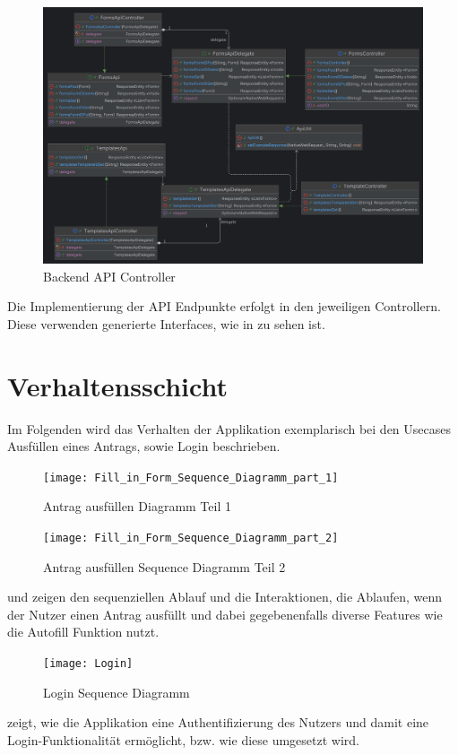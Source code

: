 \begin{figure}[H]
    \centering
    \includegraphics[width=15cm]{images/classDiagrams/Api}
    \caption{Backend API Controller}\label{fig:Backend-API-Controller}
\end{figure}

Die Implementierung der \ac{API} Endpunkte erfolgt in den jeweiligen Controllern.
Diese verwenden generierte Interfaces, wie in  zu sehen ist.


\section{Verhaltensschicht}\label{sec:verhaltensschicht}
Im Folgenden wird das Verhalten der Applikation exemplarisch bei den Usecases Ausfüllen 
eines Antrags, sowie Login beschrieben.

\begin{figure}[H]
    \texttt{[image: Fill\_in\_Form\_Sequence\_Diagramm\_part\_1]}
    \caption{Antrag ausfüllen Diagramm Teil 1}\label{fig:Antrag Flow 1}
\end{figure}   
\begin{figure}[H]
    \texttt{[image: Fill\_in\_Form\_Sequence\_Diagramm\_part\_2]}
    \caption{Antrag ausfüllen Sequence Diagramm Teil 2}\label{fig:Antrag Flow 2}
\end{figure}
 und  zeigen den sequenziellen Ablauf 
und die Interaktionen, die Ablaufen, wenn der Nutzer einen Antrag ausfüllt und dabei 
gegebenenfalls diverse Features wie die Autofill Funktion nutzt.
\begin{figure}[H]
    \texttt{[image: Login]}
    \caption{Login Sequence Diagramm}\label{fig:Login Flow}
\end{figure}
 zeigt, wie die Applikation eine Authentifizierung des Nutzers und damit 
eine Login-Funktionalität ermöglicht, bzw. wie diese umgesetzt wird.

